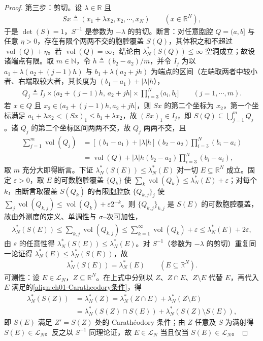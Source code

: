 \documentclass[../../main.tex]{subfiles}%
\begin{document}
\begin{proof}
第三步：剪切。设 $\lambda\in\mathbb{R}$ 且
\begin{align*}
Sx\triangleq(x_1+\lambda x_2,x_2,\cdots ,x_N)\qquad(x\in\mathbb{R}^N),
\end{align*}
于是 $\det(S)=1$，$S^{-1}$ 是参数为 $-\lambda$ 的剪切。断言：对任意胞腔 $Q=(a,b]$ 与任意 $\eta>0$，存在有限个两两不交的胞腔覆盖 $S(Q)$，其体积之和不超过 $\operatorname{vol}(Q)+\eta$。若 $\operatorname{vol}(Q)=\infty$，结论由 $\lambda_N^*(S(Q))\leqslant\infty$ 空洞成立；故设诸端点有限。取 $m\in\mathbb{N}$，令 $h\triangleq(b_2-a_2)/m$，并令 $I_j$ 为以 $a_1+\lambda(a_2+(j-1)h)$ 与 $b_1+\lambda(a_2+jh)$ 为端点的区间（左端取两者中较小者、右端取较大者，其长度为 $(b_1-a_1)+|\lambda|h$），
\begin{align*}
Q_j\triangleq I_j\times(a_2+(j-1)h,\,a_2+jh]\times\prod_{i=3}^N(a_i,b_i]\qquad(j=1,\cdots ,m).
\end{align*}
若 $x\in Q$ 且 $x_2\in(a_2+(j-1)h,a_2+jh]$，则 $Sx$ 的第二个坐标为 $x_2$，第一个坐标满足 $a_1+\lambda x_2<(Sx)_1\leqslant b_1+\lambda x_2$，故 $(Sx)_1\in I_j$，即 $S(Q)\subseteq\bigcup_{j=1}^mQ_j$。诸 $Q_j$ 的第二个坐标区间两两不交，故 $Q_j$ 两两不交，且
\begin{align*}
\sum_{j=1}^m\operatorname{vol}(Q_j)&=\left[(b_1-a_1)+|\lambda|h\right](b_2-a_2)\prod_{i=3}^N(b_i-a_i)\\
&=\operatorname{vol}(Q)+|\lambda|h(b_2-a_2)\prod_{i=3}^N(b_i-a_i),
\end{align*}
取 $m$ 充分大即得断言。下证 $\lambda_N^*(S(E))\leqslant\lambda_N^*(E)$ 对一切 $E\subseteq\mathbb{R}^N$ 成立。固定 $\varepsilon>0$，取 $E$ 的可数胞腔覆盖 $\{Q_k\}$ 使 $\sum_k\operatorname{vol}(Q_k)\leqslant\lambda_N^*(E)+\varepsilon$；对每个 $k$，由断言取覆盖 $S(Q_k)$ 的有限胞腔族 $\{Q_{k,j}\}_j$ 使 $\sum_j\operatorname{vol}(Q_{k,j})\leqslant\operatorname{vol}(Q_k)+\varepsilon2^{-k}$。则 $\{Q_{k,j}\}_{k,j}$ 是 $S(E)$ 的可数胞腔覆盖，故由外测度的定义、单调性与 $\sigma$--次可加性，
\begin{align*}
\lambda_N^*(S(E))\leqslant\sum_{k,j}\operatorname{vol}(Q_{k,j})\leqslant\sum_{k=1}^\infty\operatorname{vol}(Q_k)+\varepsilon\leqslant\lambda_N^*(E)+2\varepsilon,
\end{align*}
由 $\varepsilon$ 的任意性得 $\lambda_N^*(S(E))\leqslant\lambda_N^*(E)$。对 $S^{-1}$（参数为 $-\lambda$ 的剪切）重复同一论证得 $\lambda_N^*(E)\leqslant\lambda_N^*(S(E))$，故
\begin{align*}
\lambda_N^*(S(E))=\lambda_N^*(E)\qquad(E\subseteq\mathbb{R}^N).
\end{align*}
可测性：设 $E\in\mathcal{L}_N$，$Z\subseteq\mathbb{R}^N$。在上式中分别以 $Z$、$Z\cap E$、$Z\setminus E$ 代替 $E$，再代入 $E$ 满足的\eqref{align:ch01-Caratheodory条件}，得
\begin{align*}
\lambda_N^*(S(Z))&=\lambda_N^*(Z)=\lambda_N^*(Z\cap E)+\lambda_N^*(Z\setminus E)\\
&=\lambda_N^*(S(Z)\cap S(E))+\lambda_N^*(S(Z)\setminus S(E)),
\end{align*}
即 $S(E)$ 满足 $Z'=S(Z)$ 处的 Carathéodory 条件；由 $Z$ 任意及 $S$ 为满射得 $S(E)\in\mathcal{L}_N$。反之以 $S^{-1}$ 同理论证，故 $E\in\mathcal{L}_N$ 当且仅当 $S(E)\in\mathcal{L}_N$。


\end{proof}
\end{document}
